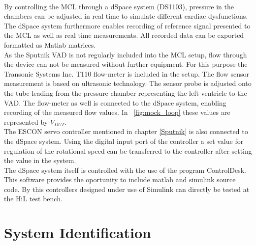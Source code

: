 \\By controlling the MCL through a dSpace system (DS1103), pressure in the chambers can be adjusted in real time to simulate different cardiac dysfunctions. The dSpace system furthermore enables recording of reference signal presented to the MCL as well as real time measurements. All recorded data can be exported formatted as Matlab matrices.
\\As the Sputnik VAD is not regularly included into the MCL setup, flow through the device can not be measured without further equipment. For this purpose the Transonic Systems Inc. T110 flow-meter is included in the setup. The flow sensor measurement is based on ultrasonic technology. The sensor probe is adjusted onto the tube leading from the pressure chamber representing the left ventricle to the VAD. The flow-meter as well is connected to the dSpace system, enabling recording of the measured flow values. In \figurename~\ref{fig:mock_loop} these values are represented by $\dot{V}_{DUT}$.
\\The ESCON servo controller mentioned in chapter \ref{Sputnik} is also connected to the dSpace system. Using the digital input port of the controller a set value for regulation of the rotational speed can be transferred to the controller after setting the value in the system.
\\The dSpace system itself is controlled with the use of the program ControlDesk. This software provides the oportunity to include matlab and simulink source code. By this controllers designed under use of Simulink can directly be tested at the HiL test bench.

\section{System Identification}

